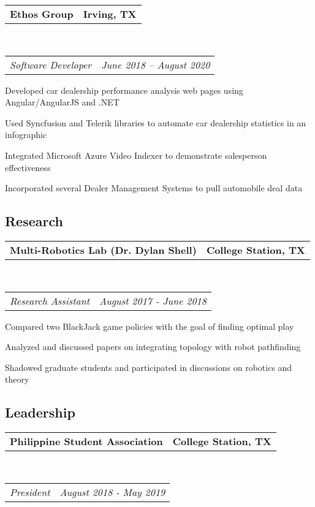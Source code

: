 \documentclass[10pt,letterpaper]{article}
\makeatletter
\newenvironment{indentsection}[1]%
{\begin{list}{}%
	{\setlength{\leftmargin}{#1}}%
	\item[]%
}
{\end{list}}
\newcommand{\headerrow}[2]
{\begin{tabular*}{\linewidth}{l@{\extracolsep{\fill}}r}
	#1 &
	#2 \\
\end{tabular*}}
\makeatother
\begin{document}
\begin{indentsection}{\parindent}
	\vspace{-0.4em}
	\headerrow
		{\textbf{Ethos Group}}
		{\textbf{Irving, TX}}
	\\
	\headerrow
		{\emph{Software Developer}}
		{\emph{June 2018 -- August 2020}}
	\begin{itemize*}
		\item Developed car dealership performance analysis web pages using Angular/AngularJS and .NET
		\item Used Syncfusion and Telerik libraries to automate car dealership statistics in an infographic
		\item Integrated Microsoft Azure Video Indexer to demonstrate salesperson effectiveness 
		\item Incorporated several Dealer Management Systems to pull automobile deal data
	\end{itemize*}
\end{indentsection}

\vspace{-1.8em}
\subsection*{Research}
\begin{indentsection}{\parindent}
	\vspace{-0.4em}
	\headerrow
		{\textbf{Multi-Robotics Lab (Dr. Dylan Shell)}}
		{\textbf{College Station, TX}}
	\\
	\headerrow
		{\emph{Research Assistant}}
		{\emph{August 2017 - June 2018}}
	\begin{itemize*}
		\item Compared two BlackJack game policies with the goal of finding optimal play 
		\item Analyzed and discussed papers on integrating topology with robot pathfinding
		\item Shadowed graduate students and participated in discussions on robotics and theory
	\end{itemize*}
\end{indentsection}

\vspace{-1.8em}
\subsection*{Leadership}
\begin{indentsection}{\parindent}
	\vspace{-0.4em}
	\headerrow
		{\textbf{Philippine Student Association}}
		{\textbf{College Station, TX}}
		\\
	\headerrow
		{\emph{President}}
		{\emph{August 2018 - May 2019}}

\end{indentsection}
\newif\ifdraft
\draftfalse %
\end{document}

